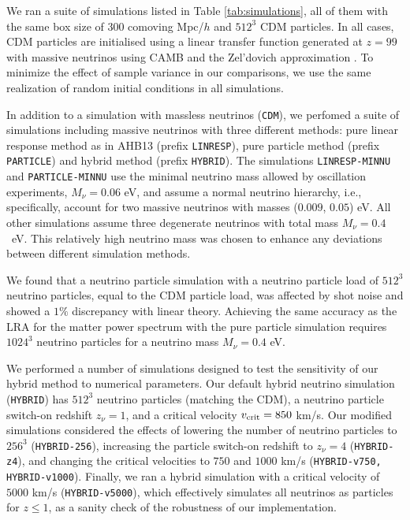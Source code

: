 \documentclass[useAMS, usenatbib]{mnras}
\begin{document}
We ran a suite of simulations listed in Table \ref{tab:simulations}, all of them with the same box size of $300$ comoving Mpc/$h$ and $512^3$ CDM particles. In all cases, CDM particles are initialised using a linear transfer function generated at $z=99$ with massive neutrinos using CAMB \citep{CAMB_neutrinos} and the Zel'dovich approximation \citep{Zeldovich_1970}. To minimize the effect of sample variance in our comparisons, we use the same realization of random initial conditions in all simulations.

In addition to a simulation with massless neutrinos (\texttt{CDM}), we perfomed a suite of simulations including massive neutrinos with three different methods: pure linear response method as in AHB13 (prefix \texttt{LINRESP}), pure particle method (prefix \texttt{PARTICLE}) and hybrid method (prefix \texttt{HYBRID}). The simulations \texttt{LINRESP-MINNU} and \texttt{PARTICLE-MINNU} use the minimal neutrino mass allowed by oscillation experiments, $M_\nu = 0.06$ eV, and assume a normal neutrino hierarchy, i.e., specifically, account for two massive neutrinos with masses ($0.009$, $0.05$) eV. All other simulations assume three degenerate neutrinos with total mass $M_\nu = 0.4$~eV. This relatively high neutrino mass was chosen to enhance any deviations between different simulation methods.

We found that a neutrino particle simulation with a neutrino particle load of $512^3$ neutrino particles, equal to the CDM particle load, was affected by shot noise and showed a $1\%$ discrepancy with linear theory. Achieving the same accuracy as the LRA for the matter power spectrum with the pure particle simulation requires $1024^3$ neutrino particles for a neutrino mass $M_\nu = 0.4$ eV.


We performed a number of simulations designed to test the sensitivity of our hybrid method to numerical parameters. Our default hybrid neutrino simulation (\texttt{HYBRID}) has $512^3$ neutrino particles (matching the CDM), a neutrino particle switch-on redshift $z_\nu = 1$, and a critical velocity $v_{\rm crit} = 850$ km/s. Our modified simulations considered the effects of lowering the number of neutrino particles to $256^3$ (\texttt{HYBRID-256}), increasing the particle switch-on redshift to $z_\nu = 4$ (\texttt{HYBRID-z4}), and changing the critical velocities to $750$ and $1000$ km/s (\texttt{HYBRID-v750, HYBRID-v1000}). Finally, we ran a hybrid simulation with a critical velocity of $5000$ km/s (\texttt{HYBRID-v5000}), which effectively simulates all neutrinos as particles for $z \leq 1$, as a sanity check of the robustness of our implementation.
\end{document}
